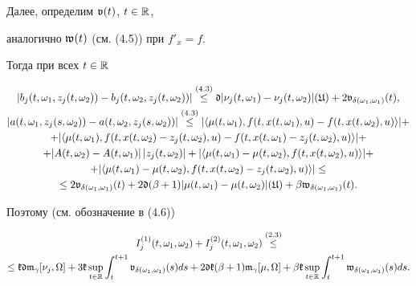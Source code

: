 Далее, определим $\frak v(t)$, $t\in\Bbb R$,


аналогично $\frak w(t)$ (см. (4.5)) при $f'_{x}=f$.


Тогда при всех $t\in\Bbb R$


\begin{gather*}


|b_j(t,\om_1,z_j(t,\om_2))-b_j(t,\om_2,z_j(t,\om_2))|


\overset{(4.3)}{\le}{}\frak d|\nu_{j}(t,\om_1)-\nu_{j}(t,\om_2)|(\frak U)+


2\frak v_{\dl(\om_{1},\om_{1})}(t),\\


%


|a(t,\om_1,z_j(s,\om_2))-a(t,\om_2,z_j(s,\om_2))|


\overset{(4.3)}{\le}{}


|\la\mu(t,\om_{1}),f(t,x(t,\om_{1}),u)-f(t,x(t,\om_{2}),u)\ra|+\\


%


+|\la\mu(t,\om_{1}),f(t,x(t,\om_{2})-z_{j}(t,\om_{2}),u)


-f(t,x(t,\om_{1})-z_{j}(t,\om_{2}),u)\ra|+\\


%


+|A(t,\om_{2})-A(t,\om_{1})|\, |z_{j}(t,\om_{2})|+


|\la\mu(t,\om_{1})-\mu(t,\om_{2}),f(t,x(t,\om_{2}),u)\ra|+\\


%


+|\la\mu(t,\om_{1})-\mu(t,\om_{2}),f(t,x(t,\om_{2})-z_{j}(t,\om_{2}),u)\ra|


\le \\


%


\le 2\frak v_{\dl(\om_{1},\om_{1})}(t)+


2\frak d(\beta+1)|\mu(t,\om_{1})-\mu(t,\om_{2})|(\frak U)+


\beta\frak w_{\dl(\om_{1},\om_{1})}(t).


\end{gather*}


Поэтому (см. обозначение в (4.6))


\begin{multline*}


I_j^{(1)}(t,\om_1,\om_2)+I_j^{(2)}(t,\om_1,\om_2)\overset{(2.3)}{\le}\\


%


\le\frak k\frak d\frak m_{\gamma}[\nu_{j},\Om]+3\frak k\sup\lt_{t\in\R}


\int_{t}^{t+1}\frak v_{\dl(\om_{1},\om_{1})}(s)ds+


2\frak d\frak k(\beta+1)\frak m_{\gamma}[\mu,\Om]+


\beta\frak k\sup\lt_{t\in\R}\int_{t}^{t+1}


\frak w_{\dl(\om_{1},\om_{1})}(s)ds.


\end{multline*}


